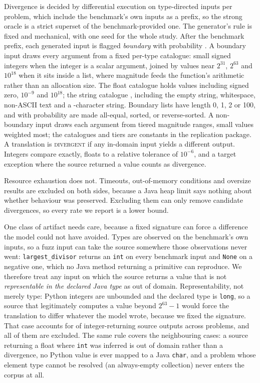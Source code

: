 \documentclass[sigconf]{acmart}
\begin{document}
Divergence is decided by differential execution on \NFuzz{} type-directed inputs per problem,
which include the benchmark's own inputs as a prefix, so the strong oracle is a strict superset
of the benchmark-provided one. The generator's rule is fixed and mechanical, with one seed for
the whole study. After the benchmark prefix, each generated input is flagged \emph{boundary}
with probability \BoundaryFraction. A boundary input draws every argument from a fixed per-type
catalogue: \NScalarIntBoundaries{} small signed integers when the integer is a scalar argument,
joined by \NElemExtraBoundaries{} values near
$2^{31}$, $2^{63}$ and $10^{18}$ when it sits inside a list, where magnitude feeds the
function's arithmetic rather than an allocation size. The float catalogue holds
\NFloatBoundaries{} values including signed zero, $10^{-9}$ and $10^{18}$; the string catalogue
\NStrBoundaries{}, including the empty string, whitespace, non-ASCII text and a
\MaxStrBoundaryLen-character string. Boundary lists have
length 0, 1, 2 or 100, and with probability \ListShapeProb{} are made all-equal, sorted, or
reverse-sorted. A non-boundary input draws each argument from tiered magnitude ranges, small
values weighted most; the catalogues and tiers are constants in the replication
package. A translation is \textsc{divergent} if any in-domain input yields a
different output. Integers compare exactly, floats to a relative tolerance of $10^{-6}$, and a
target exception where the source returned a value counts as divergence.

Resource exhaustion does not. Timeouts, out-of-memory conditions and oversize results are
excluded on both sides, because a Java heap limit says nothing about whether behaviour was
preserved. Excluding them can only remove candidate divergences, so every rate we report is a
lower bound.

One class of artifact needs care, because a fixed signature can force a difference the model
could not have avoided. Types are observed on the benchmark's own inputs, so a fuzz input can
take the source somewhere those observations never went: \texttt{largest\_divisor} returns an
\texttt{int} on every benchmark input and \texttt{None} on a negative one, which no Java method
returning a primitive can reproduce. We therefore treat any input on which the source returns a
value that is not \emph{representable in the declared Java type} as out of domain.
Representability, not merely type: Python integers are unbounded and the declared type is
\texttt{long}, so a source that legitimately computes a value beyond $2^{63}-1$ would force the
translation to differ whatever the model wrote, because we fixed the signature. That case
accounts for \OutOfRange{} of \IntReturning{} integer-returning source outputs across
\OutOfRangeProblems{} problems, and all of them are excluded. The same rule covers the
neighbouring cases: a source returning a float where \texttt{int} was inferred is out of domain
rather than a divergence, no Python value is ever mapped to a Java \texttt{char}, and a problem
whose element type cannot be resolved (an always-empty collection) never enters the corpus at all.
\end{document}
